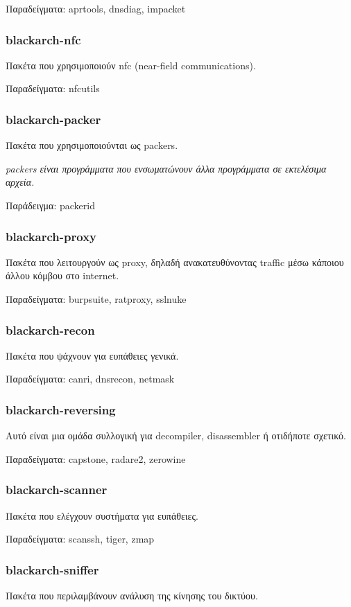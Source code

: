 \documentclass[a4paper, oneside, 11pt]{book}
\begin{document}
Παραδείγματα: aprtools, dnsdiag, impacket

\subsubsection{blackarch-nfc}
Πακέτα που χρησιμοποιούν nfc (near-field communications).

Παραδείγματα: nfcutils

\subsubsection{blackarch-packer}
Πακέτα που χρησιμοποιούνται ως packers.

\textit{packers είναι προγράμματα που ενσωματώνουν άλλα προγράμματα
σε εκτελέσιμα αρχεία.}

Παράδειγμα: packerid

\subsubsection{blackarch-proxy}
Πακέτα που λειτουργούν ως proxy, δηλαδή ανακατευθύνοντας traffic
μέσω κάποιου άλλου κόμβου στο internet.

Παραδείγματα: burpsuite, ratproxy, sslnuke

\subsubsection{blackarch-recon}
Πακέτα που ψάχνουν για ευπάθειες γενικά.

Παραδείγματα: canri, dnsrecon, netmask

\subsubsection{blackarch-reversing}
Αυτό είναι μια ομάδα συλλογική για decompiler,
disassembler ή οτιδήποτε σχετικό.

Παραδείγματα: capstone, radare2, zerowine

\subsubsection{blackarch-scanner}
Πακέτα που ελέγχουν συστήματα για ευπάθειες.

Παραδείγματα: scanssh, tiger, zmap

\subsubsection{blackarch-sniffer}
Πακέτα που περιλαμβάνουν ανάλυση της κίνησης του δικτύου.
\end{document}
